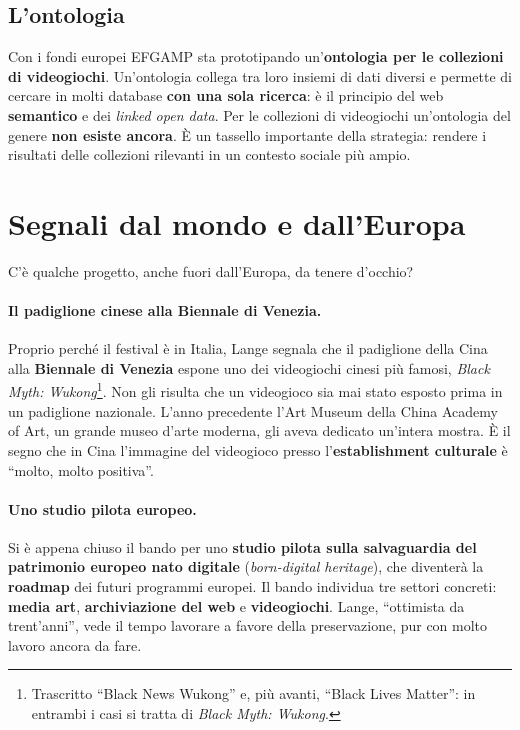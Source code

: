 \subsection{L'ontologia}

Con i fondi europei EFGAMP sta prototipando un'\textbf{ontologia per le
collezioni di videogiochi}. Un'ontologia collega tra loro insiemi di dati
diversi e permette di cercare in molti database \textbf{con una sola
ricerca}: è il principio del web \textbf{semantico} e dei \emph{linked open
data}. Per le collezioni di videogiochi un'ontologia del genere \textbf{non esiste
ancora}. È un tassello importante della strategia: rendere i risultati delle
collezioni rilevanti in un contesto sociale più ampio.

\section{Segnali dal mondo e dall'Europa}
\label{sec:c1-4-segnali}

C'è qualche progetto, anche fuori dall'Europa, da tenere d'occhio?

\paragraph{Il padiglione cinese alla Biennale di Venezia.} Proprio perché il
festival è in Italia, Lange segnala che il padiglione della Cina alla
\textbf{Biennale di Venezia} espone uno dei videogiochi cinesi più famosi,
\emph{Black Myth: Wukong}\footnote{Trascritto ``Black News Wukong'' e, più
avanti, ``Black Lives Matter'': in entrambi i casi si tratta di \emph{Black Myth:
Wukong}.}. Non gli risulta che un videogioco sia mai stato esposto prima in un
padiglione nazionale. L'anno precedente l'Art Museum della China Academy of Art,
un grande museo d'arte moderna, gli aveva dedicato un'intera mostra. È il segno
che in Cina l'immagine del videogioco presso l'\textbf{establishment culturale}
è ``molto, molto positiva''.

\paragraph{Uno studio pilota europeo.} Si è appena chiuso il bando per uno
\textbf{studio pilota sulla salvaguardia del patrimonio europeo nato digitale}
(\emph{born-digital heritage}), che diventerà la \textbf{roadmap} dei futuri
programmi europei. Il bando individua tre settori concreti: \textbf{media art},
\textbf{archiviazione del web} e \textbf{videogiochi}. Lange, ``ottimista da
trent'anni'', vede il tempo lavorare a favore della preservazione, pur con molto
lavoro ancora da fare.

